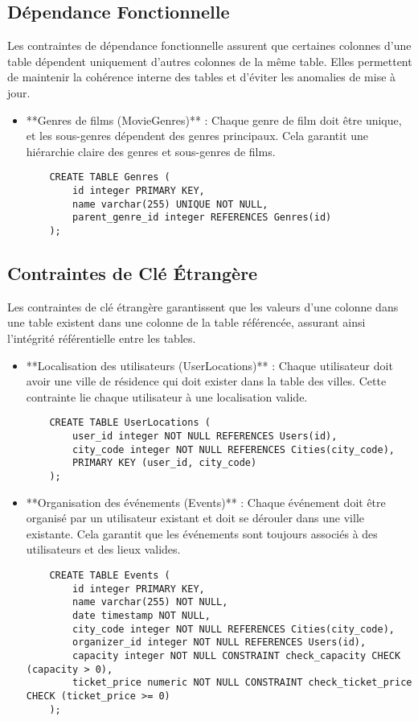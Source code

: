 \subsection{Dépendance Fonctionnelle}

Les contraintes de dépendance fonctionnelle assurent que certaines colonnes d'une table dépendent uniquement d'autres colonnes de la même table. Elles permettent de maintenir la cohérence interne des tables et d'éviter les anomalies de mise à jour.

\begin{itemize}
    \item **Genres de films (MovieGenres)** : Chaque genre de film doit être unique, et les sous-genres dépendent des genres principaux. Cela garantit une hiérarchie claire des genres et sous-genres de films.
    \begin{lstlisting}
    CREATE TABLE Genres (
        id integer PRIMARY KEY,
        name varchar(255) UNIQUE NOT NULL,
        parent_genre_id integer REFERENCES Genres(id)
    );
    \end{lstlisting}
\end{itemize}

\subsection{Contraintes de Clé Étrangère}

Les contraintes de clé étrangère garantissent que les valeurs d'une colonne dans une table existent dans une colonne de la table référencée, assurant ainsi l'intégrité référentielle entre les tables.

\begin{itemize}
    \item **Localisation des utilisateurs (UserLocations)** : Chaque utilisateur doit avoir une ville de résidence qui doit exister dans la table des villes. Cette contrainte lie chaque utilisateur à une localisation valide.
    \begin{lstlisting}
    CREATE TABLE UserLocations (
        user_id integer NOT NULL REFERENCES Users(id),
        city_code integer NOT NULL REFERENCES Cities(city_code),
        PRIMARY KEY (user_id, city_code)
    );
    \end{lstlisting}
    \item **Organisation des événements (Events)** : Chaque événement doit être organisé par un utilisateur existant et doit se dérouler dans une ville existante. Cela garantit que les événements sont toujours associés à des utilisateurs et des lieux valides.
    \begin{lstlisting}
    CREATE TABLE Events (
        id integer PRIMARY KEY,
        name varchar(255) NOT NULL,
        date timestamp NOT NULL,
        city_code integer NOT NULL REFERENCES Cities(city_code),
        organizer_id integer NOT NULL REFERENCES Users(id),
        capacity integer NOT NULL CONSTRAINT check_capacity CHECK (capacity > 0),
        ticket_price numeric NOT NULL CONSTRAINT check_ticket_price CHECK (ticket_price >= 0)
    );
    \end{lstlisting}
\end{itemize}

